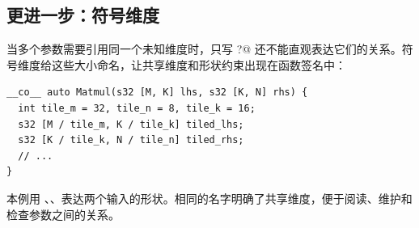 \subsection*{更进一步：符号维度}

当多个参数需要引用同一个未知维度时，只写 \co@?@ 还不能直观表达它们的关系。符号维度给这些大小命名，让共享维度和形状约束出现在函数签名中：

\begin{lstlisting}[language=croqtile,caption={更进一步：符号维度}]
__co__ auto Matmul(s32 [M, K] lhs, s32 [K, N] rhs) {
  int tile_m = 32, tile_n = 8, tile_k = 16;
  s32 [M / tile_m, K / tile_k] tiled_lhs;
  s32 [K / tile_k, N / tile_n] tiled_rhs;
  // ...
}
\end{lstlisting}

本例用 \co@M@、\co@K@、\co@N@ 表达两个输入的形状。相同的名字明确了共享维度，便于阅读、维护和检查参数之间的关系。
